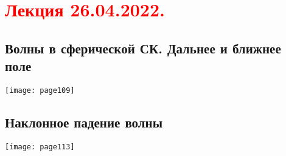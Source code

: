 \documentclass[main.tex]{subfiles}
\begin{document}
\section{\textcolor{red}{Лекция 26.04.2022.}}

\subsection{Волны в сферической СК. Дальнее и ближнее поле}
\texttt{[image: page109]}




\subsection{Наклонное падение волны}
\texttt{[image: page113]}


\end{document}
